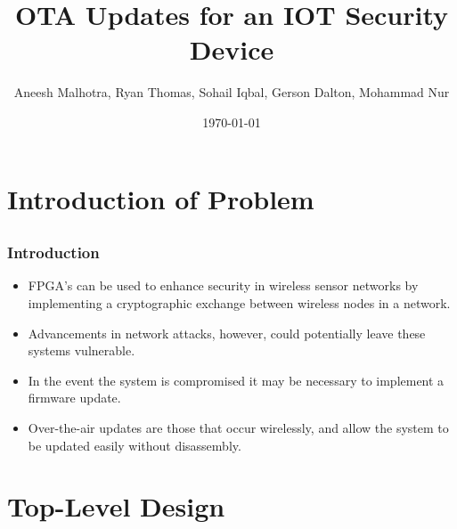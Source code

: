 \documentclass{beamer}
\title{OTA Updates for an IOT Security Device}
\author{Aneesh Malhotra, Ryan Thomas, Sohail Iqbal, Gerson Dalton, Mohammad Nur}
\date{\today}
\begin{document}
\frame{\titlepage}

\section[Outline]{}
\frame{\tableofcontents}

\section{Introduction of Problem}
\subsection{}
\frame
{
  \frametitle{Introduction}
  
  \begin{itemize}
  \item FPGA's can be used to enhance security in wireless sensor networks by implementing a cryptographic exchange between wireless nodes in a network. 
  \item Advancements in network attacks, however, could potentially leave these systems vulnerable. 
  \item In the event the system is compromised it may be necessary to implement a firmware update. 
  \item Over-the-air updates are those that occur wirelessly, and allow the system to be updated easily without disassembly. 

  \end{itemize}
}


\section{Top-Level Design}
\end{document}
